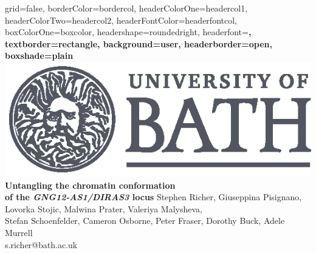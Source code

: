 \documentclass[a0paper, portrait]{baposter}
\begin{document}
\begin{poster}{
	grid=false,
	borderColor=bordercol, %
	headerColorOne=headercol1, %
	headerColorTwo=headercol2, %
	headerFontColor=headerfontcol, %
	boxColorOne=boxcolor, %
	headershape=roundedright, %
	headerfont=\Large\sf\bf, %
	textborder=rectangle,
	background=user,
	headerborder=open, %
	boxshade=plain
} 
%
%
{\includegraphics[scale=0.6]{uob-logo.eps}} %
{\sf\bf\huge Untangling the chromatin conformation \\ of the \textit{GNG12-AS1/DIRAS3} locus} %
{\vspace{0.5em} \normalsize Stephen Richer, Giuseppina Pisignano, Lovorka Stojic, Malwina Prater, Valeriya Malysheva, \\ Stefan Schoenfelder, Cameron Osborne, Peter Fraser, Dorothy Buck, Adele Murrell \\ 
{\vspace{0.5em} s.richer@bath.ac.uk}} 

\end{poster}
\end{document}
